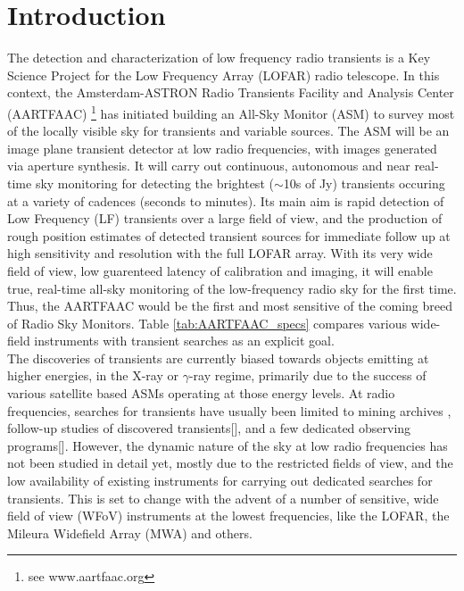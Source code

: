 \documentclass{aa}
\begin{document}
\section{\label{sec:Introduction}Introduction}
The detection  and characterization of low  frequency radio transients  is a Key
Science  Project \citep{fender2006lofar}  for  the Low  Frequency Array  (LOFAR)
\citep{vanhaarlem2013lofar}   radio    telescope.    In   this    context,   the
Amsterdam-ASTRON    Radio    Transients    Facility    and    Analysis    Center
(AARTFAAC) \footnote{see www.aartfaac.org }  has initiated building an All-Sky
Monitor  (ASM) to  survey most  of the  locally visible  sky for  transients and
variable sources.   The ASM  will be  an image plane  transient detector  at low
radio frequencies, with images generated  via aperture synthesis.  It will carry
out continuous, autonomous  and near real-time sky monitoring  for detecting the
brightest  ($\sim$10s  of Jy)  transients  occuring  at  a variety  of  cadences
(seconds to  minutes). Its  main aim  is rapid detection  of Low  Frequency (LF)
transients over  a large  field of  view, and the  production of  rough position
estimates  of  detected  transient  sources  for immediate  follow  up  at  high
sensitivity and resolution  with the full LOFAR array. With  its very wide field
of view, low guarenteed latency of calibration and imaging, it will enable true,
real-time  all-sky monitoring  of  the  low-frequency radio  sky  for the  first
time. Thus,  the AARTFAAC would  be the first  and most sensitive of  the coming
breed of  Radio Sky  Monitors.  Table \ref{tab:AARTFAAC_specs}  compares various
wide-field instruments with transient searches as an explicit goal.\\

The discoveries of  transients are currently biased towards  objects emitting at
higher  energies, in  the X-ray  or $\gamma$-ray  regime, primarily  due  to the
success of  various satellite  based ASMs operating  at those energy  levels. At
radio frequencies, searches  for transients have usually been  limited to mining
archives  \citep{bower2007submillijansky,bower2011search}, follow-up  studies of
discovered     transients{[}{]},    and     a     few    dedicated     observing
programs{[}{]}. However, the dynamic nature  of the sky at low radio frequencies
has not been studied in detail yet, mostly due to the restricted fields of view,
and  the low  availability of  existing instruments  for carrying  out dedicated
searches for transients.  This is set to  change with the advent of  a number of
sensitive, wide field of view (WFoV) instruments at the lowest frequencies, like
the LOFAR,  the Mileura Widefield Array  (MWA) \citep{lonsdale2009murchison} and
others.
\end{document}
